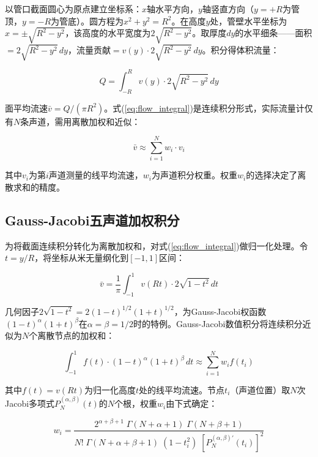 以管口截面圆心为原点建立坐标系：$x$轴水平方向，$y$轴竖直方向（$y=+R$为管顶，$y=-R$为管底）。圆方程为$x^2+y^2=R^2$。在高度$y$处，管壁水平坐标为$x = \pm\sqrt{R^2-y^2}$，该高度的水平宽度为$2\sqrt{R^2-y^2}$。取厚度$dy$的水平细条——面积$=2\sqrt{R^2-y^2}\,dy$，流量贡献$=v(y)\cdot 2\sqrt{R^2-y^2}\,dy$。积分得体积流量：

\begin{equation}
Q = \int_{-R}^{R} v(y) \cdot 2\sqrt{R^2 - y^2} \, dy
\label{eq:flow_integral}
\end{equation}

面平均流速$\bar{v} = Q/(\pi R^2)$。式(\ref{eq:flow_integral})是连续积分形式，实际流量计仅有$N$条声道，需用离散加权和近似：

\begin{equation}
\bar{v} \approx \sum_{i=1}^{N} w_i \cdot v_i
\label{eq:discrete_sum}
\end{equation}

其中$v_i$为第$i$声道测量的线平均流速，$w_i$为声道积分权重。权重$w_i$的选择决定了离散求和的精度。

\subsection{Gauss-Jacobi五声道加权积分}

为将截面连续积分转化为离散加权和，对式(\ref{eq:flow_integral})做归一化处理。令$t = y/R$，将坐标从米无量纲化到$[-1, 1]$区间：

\begin{equation}
\bar{v} = \frac{1}{\pi} \int_{-1}^{1} v(Rt) \cdot 2\sqrt{1 - t^2} \, dt
\label{eq:normalized}
\end{equation}

几何因子$2\sqrt{1-t^2} = 2(1-t)^{1/2}(1+t)^{1/2}$，为Gauss-Jacobi权函数$(1-t)^\alpha(1+t)^\beta$在$\alpha = \beta = 1/2$时的特例。Gauss-Jacobi数值积分将连续积分近似为$N$个离散节点的加权和\cite{zheng2015improved}：

\begin{equation}
\int_{-1}^{1} f(t) \cdot (1-t)^\alpha(1+t)^\beta \, dt \approx \sum_{i=1}^{N} w_i f(t_i)
\label{eq:gj_quadrature}
\end{equation}

其中$f(t) = v(Rt)$为归一化高度$t$处的线平均流速。节点$t_i$（声道位置）取$N$次Jacobi多项式$P_N^{(\alpha,\beta)}(t)$的$N$个根，权重$w_i$由下式确定\cite{roman2022software}：

\begin{equation}
w_i = \frac{2^{\alpha+\beta+1}\;\Gamma(N+\alpha+1)\;\Gamma(N+\beta+1)}{N!\;\Gamma(N+\alpha+\beta+1)\;(1-t_i^2)\;[P_N^{(\alpha,\beta)\prime}(t_i)]^2}
\label{eq:gj_weights}
\end{equation}

